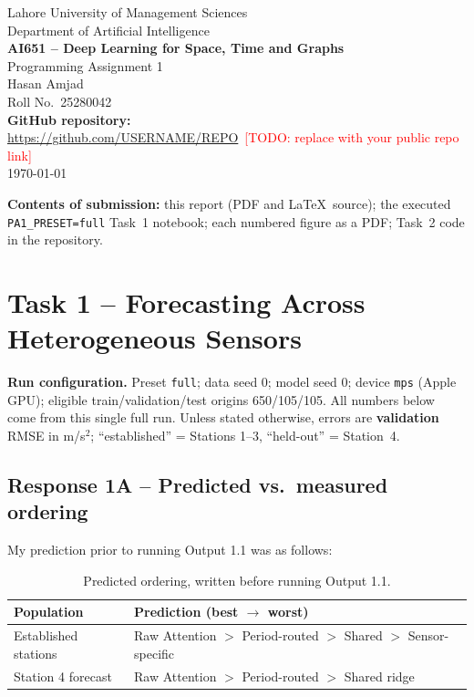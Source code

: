 \documentclass[11pt,a4paper]{article}
\newcommand{\todo}[1]{\textcolor{red}{[TODO: #1]}}
\begin{document}
\begin{titlepage}
\centering
{\large Lahore University of Management Sciences}\\[2pt]
{\large Department of Artificial Intelligence}\\[24pt]
{\LARGE \textbf{AI651 -- Deep Learning for Space, Time and Graphs}}\\[8pt]
{\Large Programming Assignment 1}\\[30pt]
{\large Hasan Amjad}\\[2pt]
{\large Roll No.\ 25280042}\\[24pt]
\textbf{GitHub repository:}\\
\url{https://github.com/USERNAME/REPO}\ \todo{replace with your public repo link}\\[24pt]
\today
\vfill
\begin{flushleft}
\small
\textbf{Contents of submission:} this report (PDF and \LaTeX\ source); the executed
\texttt{PA1\_PRESET=full} Task~1 notebook; each numbered figure as a PDF; Task~2 code in the repository.
\end{flushleft}
\end{titlepage}

\section*{Task 1 -- Forecasting Across Heterogeneous Sensors}

\noindent\textbf{Run configuration.}
Preset \texttt{full}; data seed 0; model seed 0; device \texttt{mps} (Apple GPU);
eligible train/validation/test origins 650/105/105.
All numbers below come from this single full run. Unless stated otherwise, errors are
\textbf{validation} RMSE in m/s$^2$; ``established'' = Stations 1--3, ``held-out'' = Station~4.

\subsection*{Response 1A -- Predicted vs.\ measured ordering}

My prediction prior to running Output 1.1 was as follows:

\begin{table}[H]\centering\small
\caption{Predicted ordering, written before running Output 1.1.}
\label{tab:pred1a}
\begin{tabular}{ll}
\toprule
Population & Prediction (best $\to$ worst)\\
\midrule
Established stations & Raw Attention $>$ Period-routed $>$ Shared $>$ Sensor-specific\\
Station 4 forecast   & Raw Attention $>$ Period-routed $>$ Shared ridge\\
\bottomrule
\end{tabular}
\end{table}
\end{document}
